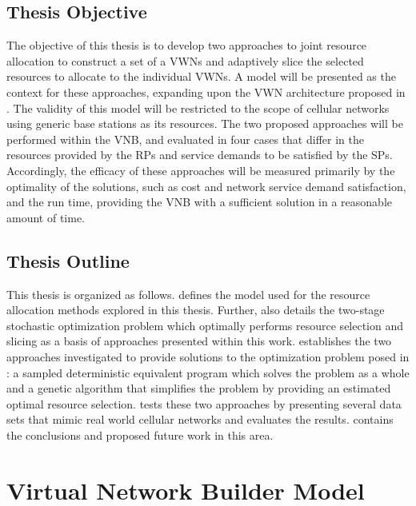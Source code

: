\documentclass[12pt,dvipsnames]{report}
\begin{document}
\section{Thesis Objective} \label{sec:objective}

The objective of this thesis is to develop two approaches to joint resource allocation to construct a set of a VWNs and adaptively slice the selected resources to allocate to the individual VWNs.  A model will be presented as the context for these approaches, expanding upon the VWN architecture proposed in .  The validity of this model will be restricted to the scope of cellular networks using generic base stations as its resources.  The two proposed approaches will be performed within the VNB, and evaluated in four cases that differ in the resources provided by the RPs and service demands to be satisfied by the SPs.  Accordingly, the efficacy of these approaches will be measured primarily by the optimality of the solutions, such as cost and network service demand satisfaction, and the run time, providing the VNB with a sufficient solution in a reasonable amount of time.

\section{Thesis Outline} \label{sec:outline}

This thesis is organized as follows.   defines the model used for the resource allocation methods explored in this thesis.  Further,  also details the two-stage stochastic optimization problem which optimally performs resource selection and slicing as a basis of approaches presented within this work.   establishes the two approaches investigated to provide solutions to the optimization problem posed in : a sampled deterministic equivalent program which solves the problem as a whole and a genetic algorithm that simplifies the problem by providing an estimated optimal resource selection.   tests these two approaches by presenting several data sets that mimic real world cellular networks and evaluates the results.   contains the conclusions and proposed future work in this area.

\pagebreak
\chapter{Virtual Network Builder Model} \label{ch:vnbmodel}
\end{document}
